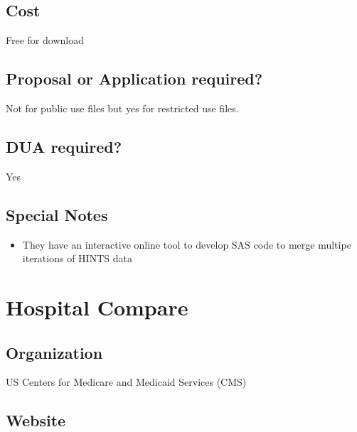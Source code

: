\documentclass[
]{book}
\providecommand{\tightlist}{%
  \setlength{\itemsep}{0pt}\setlength{\parskip}{0pt}}
\begin{document}
\hypertarget{cost-32}{%
\section{Cost}\label{cost-32}}

Free for download

\hypertarget{proposal-or-application-required-32}{%
\section{Proposal or Application required?}\label{proposal-or-application-required-32}}

Not for public use files but yes for restricted use files.

\hypertarget{dua-required-32}{%
\section{DUA required?}\label{dua-required-32}}

Yes

\hypertarget{special-notes-32}{%
\section{Special Notes}\label{special-notes-32}}

\begin{itemize}
\tightlist
\item
  They have an interactive online tool to develop SAS code to merge multipe iterations of HINTS data
\end{itemize}

\mainmatter

\hypertarget{hospital-compare}{%
\chapter{Hospital Compare}\label{hospital-compare}}

\hypertarget{organization-33}{%
\section{Organization}\label{organization-33}}

US Centers for Medicare and Medicaid Services (CMS)

\hypertarget{website-33}{%
\section{Website}\label{website-33}}
\end{document}
